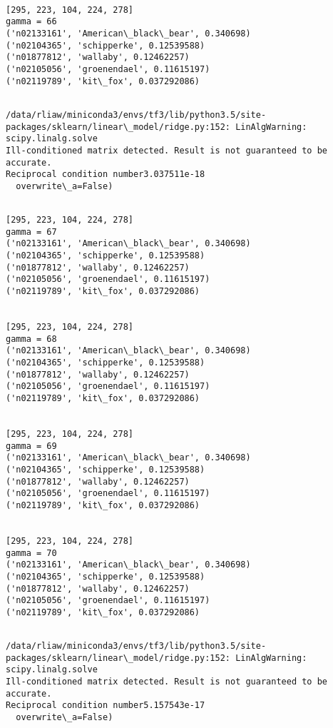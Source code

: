 \documentclass[11pt]{article}
\begin{document}
    \begin{Verbatim}[commandchars=\\\{\}]

[295, 223, 104, 224, 278]
gamma = 66
('n02133161', 'American\_black\_bear', 0.340698)
('n02104365', 'schipperke', 0.12539588)
('n01877812', 'wallaby', 0.12462257)
('n02105056', 'groenendael', 0.11615197)
('n02119789', 'kit\_fox', 0.037292086)


    \end{Verbatim}

    \begin{Verbatim}[commandchars=\\\{\}]
/data/rliaw/miniconda3/envs/tf3/lib/python3.5/site-packages/sklearn/linear\_model/ridge.py:152: LinAlgWarning: scipy.linalg.solve
Ill-conditioned matrix detected. Result is not guaranteed to be accurate.
Reciprocal condition number3.037511e-18
  overwrite\_a=False)

    \end{Verbatim}

    \begin{Verbatim}[commandchars=\\\{\}]

[295, 223, 104, 224, 278]
gamma = 67
('n02133161', 'American\_black\_bear', 0.340698)
('n02104365', 'schipperke', 0.12539588)
('n01877812', 'wallaby', 0.12462257)
('n02105056', 'groenendael', 0.11615197)
('n02119789', 'kit\_fox', 0.037292086)


[295, 223, 104, 224, 278]
gamma = 68
('n02133161', 'American\_black\_bear', 0.340698)
('n02104365', 'schipperke', 0.12539588)
('n01877812', 'wallaby', 0.12462257)
('n02105056', 'groenendael', 0.11615197)
('n02119789', 'kit\_fox', 0.037292086)


[295, 223, 104, 224, 278]
gamma = 69
('n02133161', 'American\_black\_bear', 0.340698)
('n02104365', 'schipperke', 0.12539588)
('n01877812', 'wallaby', 0.12462257)
('n02105056', 'groenendael', 0.11615197)
('n02119789', 'kit\_fox', 0.037292086)


[295, 223, 104, 224, 278]
gamma = 70
('n02133161', 'American\_black\_bear', 0.340698)
('n02104365', 'schipperke', 0.12539588)
('n01877812', 'wallaby', 0.12462257)
('n02105056', 'groenendael', 0.11615197)
('n02119789', 'kit\_fox', 0.037292086)


    \end{Verbatim}

    \begin{Verbatim}[commandchars=\\\{\}]
/data/rliaw/miniconda3/envs/tf3/lib/python3.5/site-packages/sklearn/linear\_model/ridge.py:152: LinAlgWarning: scipy.linalg.solve
Ill-conditioned matrix detected. Result is not guaranteed to be accurate.
Reciprocal condition number5.157543e-17
  overwrite\_a=False)

    \end{Verbatim}
\end{document}
